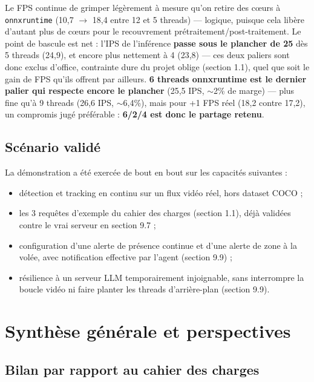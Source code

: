 \documentclass[11pt,a4paper]{article}
\let\Oldsubsection\subsection
\renewcommand{\subsection}{\FloatBarrier\Oldsubsection}
\begin{document}
    Le FPS continue de grimper légèrement à mesure qu'on retire des cœurs à
    \texttt{onnxruntime} (10,7 $\to$ 18,4 entre 12 et 5 threads) --- logique,
    puisque cela libère d'autant plus de cœurs pour le recouvrement
    prétraitement/post-traitement. Le point de bascule est net : l'IPS de
    l'inférence \textbf{passe sous le plancher de 25} dès 5 threads (24,9),
    et encore plus nettement à 4 (23,8) --- ces deux paliers sont donc
    exclus d'office, contrainte dure du projet oblige (section 1.1), quel
    que soit le gain de FPS qu'ils offrent par ailleurs. \textbf{6 threads
    onnxruntime est le dernier palier qui respecte encore le plancher}
    (25,5 IPS, $\sim$2\% de marge) --- plus fine qu'à 9 threads (26,6 IPS,
    $\sim$6,4\%), mais pour +1 FPS réel (18,2 contre 17,2), un compromis
    jugé préférable : \textbf{6/2/4 est donc le partage retenu}.
    
    \subsection{Scénario validé}
    
    La démonstration a été exercée de bout en bout sur les capacités
    suivantes :
    
    \begin{itemize}[leftmargin=1.5em]
      \item détection et tracking en continu sur un flux vidéo réel, hors
        dataset COCO ;
      \item les 3 requêtes d'exemple du cahier des charges (section 1.1),
        déjà validées contre le vrai serveur en section 9.7 ;
      \item configuration d'une alerte de présence continue et d'une
        alerte de zone à la volée, avec notification effective par l'agent
        (section 9.9) ;
      \item résilience à un serveur LLM temporairement injoignable, sans
        interrompre la boucle vidéo ni faire planter les threads
        d'arrière-plan (section 9.9).
    \end{itemize}
    
    \section{Synthèse générale et perspectives}
    
    \subsection{Bilan par rapport au cahier des charges}
    
\end{document}
